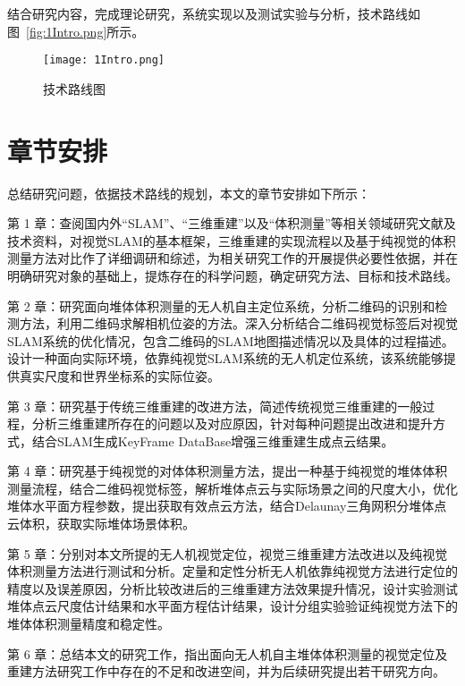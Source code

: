 结合研究内容，完成理论研究，系统实现以及测试实验与分析，技术路线如图~\ref{fig:1Intro.png}所示。
\begin{figure}[H] %
  \centering
  \texttt{[image: 1Intro.png]}
  \caption{技术路线图}
  \label{fig:1Intro}
\end{figure}
\section{章节安排}
\label{sec:1.5}
总结研究问题，依据技术路线的规划，本文的章节安排如下所示：

第 1 章：查阅国内外“SLAM”、“三维重建”以及“体积测量”等相关领域研究文献及技术资料，对视觉SLAM的基本框架，三维重建的实现流程以及基于纯视觉的体积测量方法对比作了详细调研和综述，为相关研究工作的开展提供必要性依据，并在明确研究对象的基础上，提炼存在的科学问题，确定研究方法、目标和技术路线。

第 2 章：研究面向堆体体积测量的无人机自主定位系统，分析二维码的识别和检测方法，利用二维码求解相机位姿的方法。深入分析结合二维码视觉标签后对视觉SLAM系统的优化情况，包含二维码的SLAM地图描述情况以及具体的过程描述。设计一种面向实际环境，依靠纯视觉SLAM系统的无人机定位系统，该系统能够提供真实尺度和世界坐标系的实际位姿。

第 3 章：研究基于传统三维重建的改进方法，简述传统视觉三维重建的一般过程，分析三维重建所存在的问题以及对应原因，针对每种问题提出改进和提升方式，结合SLAM生成KeyFrame DataBase增强三维重建生成点云结果。

第 4 章：研究基于纯视觉的对体体积测量方法，提出一种基于纯视觉的堆体体积测量流程，结合二维码视觉标签，解析堆体点云与实际场景之间的尺度大小，优化堆体水平面方程参数，提出获取有效点云方法，结合Delaunay三角网积分堆体点云体积，获取实际堆体场景体积。

第 5 章：分别对本文所提的无人机视觉定位，视觉三维重建方法改进以及纯视觉体积测量方法进行测试和分析。定量和定性分析无人机依靠纯视觉方法进行定位的精度以及误差原因，分析比较改进后的三维重建方法效果提升情况，设计实验测试堆体点云尺度估计结果和水平面方程估计结果，设计分组实验验证纯视觉方法下的堆体体积测量精度和稳定性。

第 6 章：总结本文的研究工作，指出面向无人机自主堆体体积测量的视觉定位及重建方法研究工作中存在的不足和改进空间，并为后续研究提出若干研究方向。